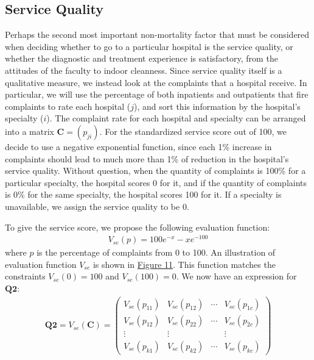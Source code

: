 \documentclass{article}
\begin{document}
\subsection{Service Quality}
Perhaps the second most important non-mortality factor that must be considered when deciding whether to go to a particular hospital is the service quality, or whether the diagnostic and treatment experience is satisfactory, from the attitudes of the faculty to indoor cleanness. Since service quality itself is a qualitative measure, we instead look at the complaints that a hospital receive. In particular, we will use the percentage of both inpatients and outpatients that fire complaints to rate each hospital ($j$), and sort this information by the hospital's specialty ($i$). The complaint rate for each hospital and specialty can be arranged into a matrix $\mathbf{C} = (p_{ji})$. For the standardized service score out of 100, we decide to use a negative exponential function, since each 1\% increase in complaints should lead to much more than 1\% of reduction in the hospital's service quality. Without question, when the quantity of complaints is 100\% for a particular specialty, the hospital scores 0 for it, and if the quantity of complaints is 0\% for the same specialty, the hospital scores 100 for it. If a specialty is unavailable, we assign the service quality to be 0.

To give the service score, we propose the following evaluation function:
\begin{gather}
    V_{se}\left(p\right) = 100e^{-x} - xe^{-100}
\end{gather}
where $p$ is the percentage of complaints from 0 to 100. An illustration of evaluation function $V_{se}$ is shown in \hyperref[fig:service_plot]{Figure 11}. This function matches the constraints $V_{se}\left(0\right) = 100$ and $V_{se}\left(100\right) = 0.$ We now have an expression for $\mathbf{Q2}$:
\begin{gather}
    \mathbf{Q2} = V_{se}\left(\mathbf{C}\right) =
    \begin{pmatrix}
    V_{se}\left(p_{11}\right) & V_{se}\left(p_{12}\right) & \cdots & V_{se}\left(p_{1c}\right)\\
    V_{se}\left(p_{12}\right) & V_{se}\left(p_{22}\right) & \cdots & V_{se}\left(p_{2c}\right)\\
    \vdots & \vdots & & \vdots\\
    V_{se}\left(p_{k1}\right) & V_{se}\left(p_{k2}\right) & \cdots & V_{se}\left(p_{kc}\right)
    \end{pmatrix}
\end{gather}
\end{document}
